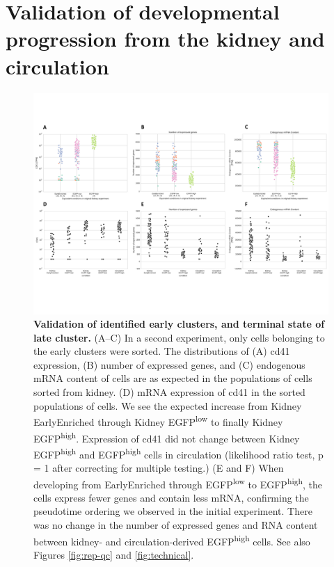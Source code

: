 \section{Validation of developmental progression from the kidney and circulation}

\begin{figure}
    \centering
    \includegraphics[width=\textwidth]{"Figure5"}
    \caption[Validation of identified early clusters and terminal state of late cluster]{\textbf{Validation of identified early clusters, and terminal state of late cluster.} (A–C) In a second experiment, only cells belonging to the early clusters were sorted. The distributions of (A) cd41 expression, (B) number of expressed genes, and (C) endogenous mRNA content of cells are as expected in the populations of cells sorted from kidney. (D) mRNA expression of cd41 in the sorted populations of cells. We see the expected increase from Kidney EarlyEnriched through Kidney EGFP\textsuperscript{low} to finally Kidney EGFP\textsuperscript{high}. Expression of cd41 did not change between Kidney EGFP\textsuperscript{high} and EGFP\textsuperscript{high} cells in circulation (likelihood ratio test, p = 1 after correcting for multiple testing.) (E and F) When developing from EarlyEnriched through EGFP\textsuperscript{low} to EGFP\textsuperscript{high}, the cells express fewer genes and contain less mRNA, confirming the pseudotime ordering we observed in the initial experiment. There was no change in the number of expressed genes and RNA content between kidney- and circulation-derived EGFP\textsuperscript{high} cells. See also Figures \ref{fig:rep-qc} and \ref{fig:technical}.}
    \label{fig:replicate}
\end{figure}

